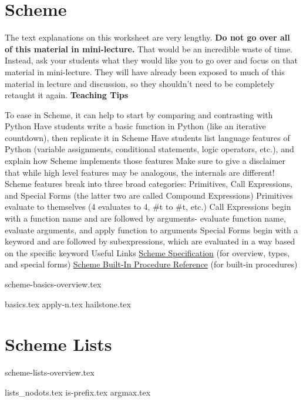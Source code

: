 \documentclass{exam}
\begin{document}
\section{Scheme}
\begin{meta}
The text explanations on this worksheet are very lengthy. \textbf{Do not go over all of this material in mini-lecture.} That would be an incredible waste of time. Instead, ask your students what they would like you to go over and focus on that material in mini-lecture. They will have already been exposed to much of this material in lecture and discussion, so they shouldn't need to be completely retaught it again. 
\textbf{Teaching Tips}
\begin{outline}[enumerate]
    \1 To ease in Scheme, it can help to start by comparing and contrasting with Python
    \2 Have students write a basic function in Python (like an iterative countdown), then replicate it in Scheme
    \2 Have students list language features of Python (variable assignments, conditional statements, logic operators, etc.), and explain how Scheme implements those features
    \2 Make sure to give a disclaimer that while high level features may be analogous, the internals are different!
    \1 Scheme features break into three broad categories: Primitives, Call Expressions, and Special Forms (the latter two are called Compound Expressions)
    \2 Primitives evaluate to themselves (4 evaluates to 4, \#t to \#t, etc.)
    \2 Call Expressions begin with a function name and are followed by arguments- evaluate function name, evaluate arguments, and apply function to arguments
    \2 Special Forms begin with a keyword and are followed by subexpressions, which are evaluated in a way based on the specific keyword
    \1 Useful Links
    \2 \href{https://cs61a.org/articles/scheme-spec/}{Scheme Specification} (for overview, types, and special forms)
    \2 \href{https://cs61a.org/articles/scheme-builtins/}{Scheme Built-In Procedure Reference} (for built-in procedures)
\end{outline}
\end{meta}

{scheme-basics-overview.tex}
\begin{questions}
{basics.tex}
{apply-n.tex}
{hailstone.tex}
\end{questions}

\section{Scheme Lists}
{scheme-lists-overview.tex}
\newpage
\begin{questions}
{lists_nodots.tex}
{is-prefix.tex}
{argmax.tex}


\end{questions}
\end{document}
